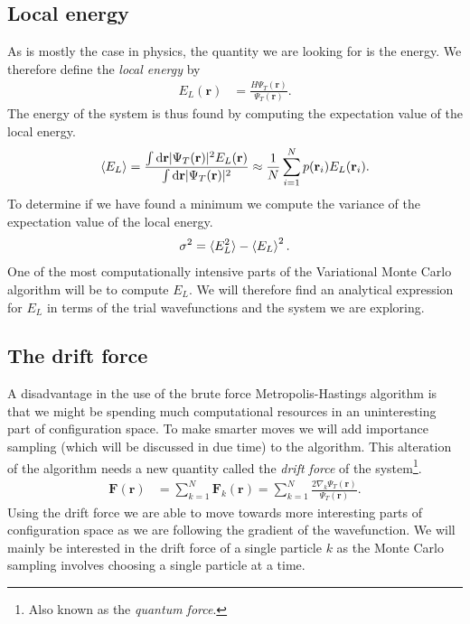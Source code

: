 \documentclass[
    a4paper, aps, twocolumn, floatfix, superscriptaddress,
    nofootinbib]{revtex4-1}
\newcommand{\vf}{\mathbf}
\newcommand{\1}{\mathds{1}}
\begin{document}
    \subsection{Local energy}
        As is mostly the case in physics, the quantity we are looking for is the
        energy. We therefore define the \emph{local energy} by
        \begin{align}
            E_L(\vf{r})
            &= \frac{H\Psi_T(\vf{r})}{\Psi_T(\vf{r})}.
        \end{align}
        The energy of the system is thus found by computing the expectation
        value of the local energy.
        \begin{align}
            \expval{E_L}
            =
            \frac{
                \int\dd \vf{r}|\Psi_T(\vf{r})|^2 E_L(\vf{r})
            }{
                \int\dd \vf{r}|\Psi_T(\vf{r})|^2
            }
            \approx
            \frac{1}{N}\sum_{i = 1}^N
            p(\vf{r}_i)E_L(\vf{r}_i).
        \end{align}
        To determine if we have found a minimum we compute the variance of the
        expectation value of the local energy.
        \begin{align}
            \sigma^2 = \langle E_L^2\rangle - \expval{E_L}^2.
        \end{align}
        One of the most computationally intensive parts of the Variational Monte
        Carlo algorithm will be to compute $E_L$. We will therefore find an
        analytical expression for $E_L$ in terms of the trial wavefunctions and
        the system we are exploring.

    \subsection{The drift force}
        A disadvantage in the use of the brute force Metropolis-Hastings
        algorithm is that we might be spending much computational resources in
        an uninteresting part of configuration space. To make smarter moves we
        will add importance sampling (which will be discussed in due time) to
        the algorithm. This alteration of the algorithm needs a new quantity
        called the \emph{drift force} of the system\footnote{Also known as the
        \emph{quantum force}.}.
        \begin{align}
            \vf{F}(\vf{r})
            &=
            \sum_{k = 1}^N
            \vf{F}_k(\vf{r})
            =
            \sum_{k = 1}^N
            \frac{2\nabla_k\Psi_T(\vf{r})}{\Psi_T(\vf{r})}.
            \label{eq:drift_force}
        \end{align}
        Using the drift force we are able to move towards more interesting parts
        of configuration space as we are following the gradient of the
        wavefunction. We will mainly be interested in the drift force of a
        single particle $k$ as the Monte Carlo sampling involves choosing a
        single particle at a time.
\end{document}
